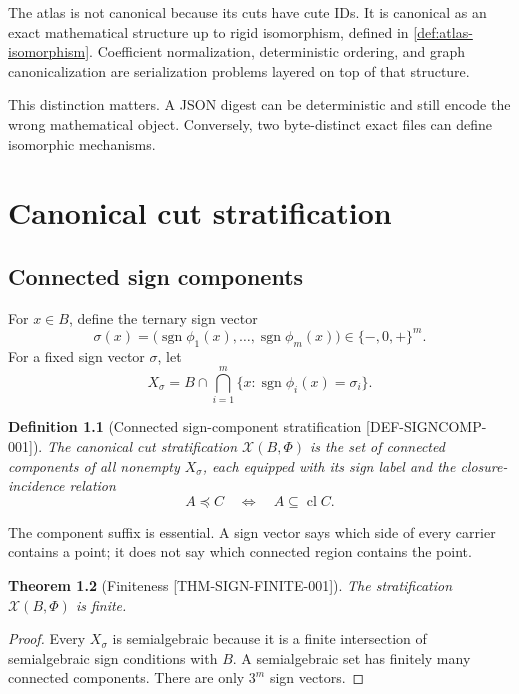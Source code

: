 \documentclass[11pt,openany]{book}
\newcommand{\cl}{\operatorname{cl}}
\newcommand{\sgn}{\operatorname{sgn}}
\newcommand{\Strat}{\mathscr X}
\newcommand{\claimid}[1]{\textnormal{\sffamily\footnotesize[#1]}}
\theoremstyle{polyplain}
\newtheorem{theorem}{Theorem}[chapter]
\theoremstyle{polydef}
\newtheorem{definition}[theorem]{Definition}
\begin{document}
The atlas is not canonical because its cuts have cute IDs. It is canonical as an exact mathematical structure up to rigid isomorphism, defined in \cref{def:atlas-isomorphism}. Coefficient normalization, deterministic ordering, and graph canonicalization are serialization problems layered on top of that structure.

This distinction matters. A JSON digest can be deterministic and still encode the wrong mathematical object. Conversely, two byte-distinct exact files can define isomorphic mechanisms.

\chapter{Canonical cut stratification}
\label{chap:stratification}

\section{Connected sign components}

For $x\in B$, define the ternary sign vector
\[
\sigma(x)=\bigl(\sgn\phi_1(x),\ldots,\sgn\phi_m(x)\bigr)\in\{-,0,+\}^m.
\]
For a fixed sign vector $\sigma$, let
\[
X_\sigma
=
B\cap\bigcap_{i=1}^m\{x:\sgn\phi_i(x)=\sigma_i\}.
\]

\begin{definition}[Connected sign-component stratification \claimid{DEF-SIGNCOMP-001}]
\label{def:sign-component-stratification}
The canonical cut stratification $\Strat(B,\Phi)$ is the set of connected components of all nonempty $X_\sigma$, each equipped with its sign label and the closure-incidence relation
\[
A\preceq C \quad\Longleftrightarrow\quad A\subseteq\cl C.
\]
\end{definition}

The component suffix is essential. A sign vector says which side of every carrier contains a point; it does not say which connected region contains the point.

\begin{theorem}[Finiteness \claimid{THM-SIGN-FINITE-001}]
\label{thm:sign-component-finiteness}
The stratification $\Strat(B,\Phi)$ is finite.
\end{theorem}

\begin{proof}
Every $X_\sigma$ is semialgebraic because it is a finite intersection of semialgebraic sign conditions with $B$. A semialgebraic set has finitely many connected components. There are only $3^m$ sign vectors.
\end{proof}
\end{document}
